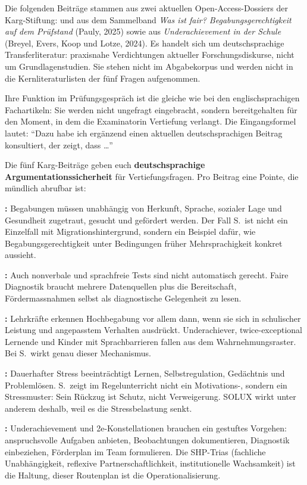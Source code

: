 \documentclass[ngerman, a4paper]{article}
\begin{document}
Die folgenden Beiträge stammen aus zwei aktuellen Open-Access-Dossiers der
Karg-Stiftung: \textcite{ahl2025begabungsgerechtigkeit} und
\textcite{koop2025herkunft} aus dem Sammelband \textit{Was ist fair?
  Begabungsgerechtigkeit auf dem Prüfstand} (Pauly, 2025) sowie
\textcite{ziesenitz2024routenplan} aus \textit{Underachievement in der Schule}
(Breyel, Evers, Koop und Lotze, 2024). Es handelt sich um deutschsprachige
Transferliteratur: praxisnahe Verdichtungen aktueller Forschungsdiskurse, nicht
um Grundlagenstudien. Sie stehen nicht im Abgabekorpus und werden nicht in
die Kernliteraturlisten der fünf Fragen aufgenommen.

Ihre Funktion im Prüfungsgespräch ist die gleiche wie bei den
englischsprachigen Fachartikeln: Sie werden nicht ungefragt eingebracht, sondern
bereitgehalten für den Moment, in dem die Examinatorin Vertiefung verlangt.
Die Eingangsformel lautet: \enquote{Dazu habe ich ergänzend einen aktuellen
  deutschsprachigen Beitrag konsultiert, der zeigt, dass \ldots}

\begin{kapitelueberblick}
  Die fünf Karg-Beiträge geben euch \textbf{deutschsprachige Argumentationssicherheit}
  für Vertiefungsfragen. Pro Beitrag eine Pointe, die mündlich abrufbar ist:

  \medskip\textbf{\textcite{ahl2025begabungsgerechtigkeit}:} Begabungen müssen
  unabhängig von Herkunft, Sprache, sozialer Lage und Gesundheit zugetraut,
  gesucht und gefördert werden. Der Fall S.\ ist nicht ein Einzelfall mit
  Migrationshintergrund, sondern ein Beispiel dafür, wie Begabungsgerechtigkeit
  unter Bedingungen früher Mehrsprachigkeit konkret aussieht.

  \medskip\textbf{\textcite{koop2025herkunft}:} Auch nonverbale und sprachfreie
  Tests sind nicht automatisch gerecht. Faire Diagnostik braucht mehrere
  Datenquellen plus die Bereitschaft, Fördermassnahmen selbst als diagnostische
  Gelegenheit zu lesen.

  \medskip\textbf{\textcite{baudson2025besserfinden}:} Lehrkräfte erkennen
  Hochbegabung vor allem dann, wenn sie sich in schulischer Leistung und
  angepasstem Verhalten ausdrückt. Underachiever, twice-exceptional Lernende und
  Kinder mit Sprachbarrieren fallen aus dem Wahrnehmungsraster. Bei S.\ wirkt
  genau dieser Mechanismus.

  \medskip\textbf{\textcite{evers2025stress}:} Dauerhafter Stress beeinträchtigt
  Lernen, Selbstregulation, Gedächtnis und Problemlösen. S.\ zeigt im
  Regelunterricht nicht ein Motivations-, sondern ein Stressmuster: Sein Rückzug
  ist Schutz, nicht Verweigerung. SOLUX wirkt unter anderem deshalb, weil es die
  Stressbelastung senkt.

  \medskip\textbf{\textcite{ziesenitz2024routenplan}:} Underachievement und
  2e-Konstellationen brauchen ein gestuftes Vorgehen: anspruchsvolle Aufgaben
  anbieten, Beobachtungen dokumentieren, Diagnostik einbeziehen, Förderplan im
  Team formulieren. Die SHP-Trias (fachliche Unabhängigkeit, reflexive
  Partnerschaftlichkeit, institutionelle Wachsamkeit) ist die Haltung, dieser
  Routenplan ist die Operationalisierung.
\end{kapitelueberblick}
\end{document}
